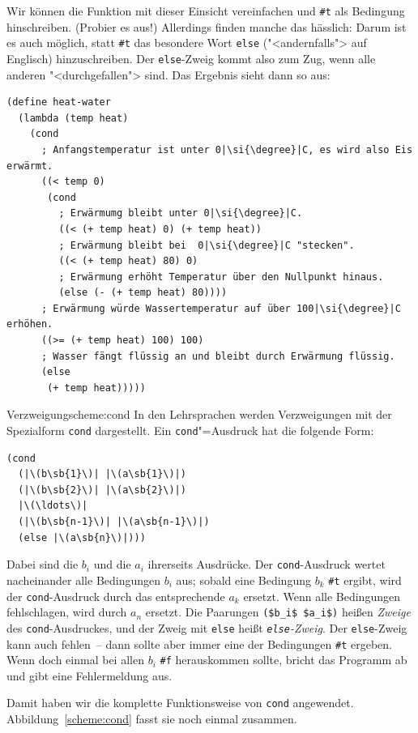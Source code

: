 Wir können die Funktion mit dieser Einsicht vereinfachen und \lstinline{#t}
als Bedingung hinschreiben.  (Probier es aus!)  Allerdings finden
manche das hässlich: Darum ist es auch möglich, statt \lstinline{#t} das
besondere Wort \lstinline{else}
("<andernfalls"> auf Englisch) hinzuschreiben.
Der \lstinline{else}-Zweig kommt also zum Zug, wenn alle anderen
"<durchgefallen"> sind.  Das Ergebnis sieht
dann so aus:
%
\begin{lstlisting}
(define heat-water
  (lambda (temp heat)
    (cond
      ; Anfangstemperatur ist unter 0|\si{\degree}|C, es wird also Eis erwärmt.
      ((< temp 0)
       (cond
         ; Erwärmumg bleibt unter 0|\si{\degree}|C.
         ((< (+ temp heat) 0) (+ temp heat))
         ; Erwärmung bleibt bei  0|\si{\degree}|C "stecken".
         ((< (+ temp heat) 80) 0)
         ; Erwärmung erhöht Temperatur über den Nullpunkt hinaus.
         (else (- (+ temp heat) 80))))
      ; Erwärmung würde Wassertemperatur auf über 100|\si{\degree}|C erhöhen.
      ((>= (+ temp heat) 100) 100)
      ; Wasser fängt flüssig an und bleibt durch Erwärmung flüssig.
      (else
       (+ temp heat)))))
\end{lstlisting}
%
\begin{feature}{Verzweigung}{scheme:cond}
In den Lehrsprachen werden Verzweigungen
mit der Spezialform \lstinline{cond} dargestellt.
Ein \lstinline{cond}"=Ausdruck hat die folgende Form:
%
\begin{lstlisting}
(cond
  (|\(b\sb{1}\)| |\(a\sb{1}\)|)
  (|\(b\sb{2}\)| |\(a\sb{2}\)|)
  |\(\ldots\)|
  (|\(b\sb{n-1}\)| |\(a\sb{n-1}\)|)
  (else |\(a\sb{n}\)|)))
\end{lstlisting}
%
Dabei sind die $b_i$ und die $a_i$ ihrerseits Ausdrücke.  Der
\lstinline{cond}-Ausdruck wertet nacheinander alle Bedingungen $b_i$ aus;
sobald eine Bedingung $b_k$ \lstinline{#t} ergibt, wird der
\lstinline{cond}-Ausdruck durch das entsprechende $a_k$ ersetzt.  Wenn
alle Bedingungen fehlschlagen, wird durch $a_n$ ersetzt.  Die Paarungen
\lstinline{($b_i$ $a_i$)} heißen \textit{Zweige} des
\lstinline{cond}-Ausdruckes, und der Zweig mit \lstinline{else}  heißt
\textit{\lstinline{else}-Zweig}.
Der \lstinline{else}-Zweig kann auch fehlen~-- dann sollte aber immer
eine der Bedingungen  \lstinline{#t} ergeben.  Wenn doch einmal bei allen
$b_i$ \lstinline{#f} herauskommen sollte, bricht \drscheme{} das Programm ab
und gibt eine Fehlermeldung aus.
\end{feature}
%
Damit haben wir die komplette Funktionsweise von \lstinline{cond}
angewendet. Abbildung~\ref{scheme:cond} fasst sie noch einmal zusammen.

